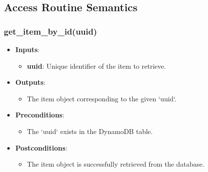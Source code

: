 \documentclass[12pt, titlepage]{article}
\begin{document}
\subsection{Access Routine Semantics}

\subsubsection{get\_item\_by\_id(uuid)}
\begin{itemize}
    \item \textbf{Inputs}:
        \begin{itemize}
            \item \textbf{uuid}: Unique identifier of the item to retrieve.
        \end{itemize}
    \item \textbf{Outputs}:
        \begin{itemize}
            \item The item object corresponding to the given `uuid`.
        \end{itemize}
    \item \textbf{Preconditions}:
        \begin{itemize}
            \item The `uuid` exists in the DynamoDB table.
        \end{itemize}
    \item \textbf{Postconditions}:
        \begin{itemize}
            \item The item object is successfully retrieved from the database.
        \end{itemize}
\end{itemize}
\end{document}
